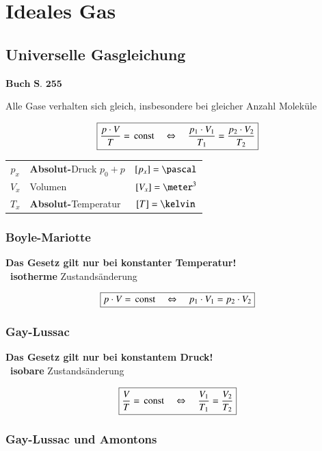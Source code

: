\section{Ideales Gas}

\subsection{Universelle Gasgleichung}

\begin{flushright}
	$\boxed{\textbf{Buch S. 255}}$
\end{flushright}


Alle Gase verhalten sich gleich, insbesondere bei gleicher Anzahl Moleküle

$$ \boxed{ \frac{p \cdot V}{T} = \, \mathop{} \! \mathrm{const} \quad \Leftrightarrow \quad \frac{p_1 \cdot V_1}{T_1} = \frac{p_2 \cdot V_2}{T_2} } $$ 

\begin{tabular}{c l c}
	$p_x$ & \textbf{Absolut-}Druck $p_0 + p$ 	& $[p_x] = \pascal$ 	\\
	$V_x$ & Volumen 							& $[V_x] = \meter^3$ 	\\
	$T_x$ & \textbf{Absolut-}Temperatur			& $[T] = \kelvin$
\end{tabular}
	
	
\subsubsection{Boyle-Mariotte}	

\textbf{Das Gesetz gilt nur bei konstanter Temperatur!} \\
\textrightarrow\ \textbf{isotherme} Zustandsänderung

$$  \boxed{ p \cdot V = \, \mathop{} \! \mathrm{const} \quad \Leftrightarrow \quad p_1 \cdot V_1 = p_2 \cdot V_2 } $$ 


\subsubsection{Gay-Lussac}

\textbf{ Das Gesetz gilt nur bei konstantem Druck!} \\
\textrightarrow\ \textbf{isobare} Zustandsänderung

$$  \boxed{ \frac{V}{T} = \, \mathop{} \! \mathrm{const} \quad \Leftrightarrow \quad \frac{V_1}{T_1} = \frac{V_2}{T_2} } $$

	
\subsubsection{Gay-Lussac und Amontons}

